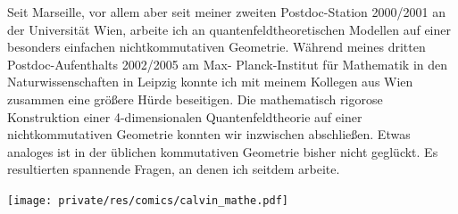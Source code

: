 \begin{multicols}{2}
Seit Marseille, vor allem aber seit meiner zweiten Postdoc-Station 2000/2001 an der Universität Wien, arbeite ich an quantenfeldtheoretischen Modellen auf einer besonders einfachen nichtkommutativen Geometrie. Während meines dritten Postdoc-Aufenthalts 2002/2005 am Max- Planck-Institut für Mathematik in den Naturwissenschaften in Leipzig konnte ich mit meinem Kollegen aus Wien zusammen eine größere Hürde beseitigen. Die mathematisch rigorose Konstruktion einer 4-dimensionalen Quantenfeldtheorie auf einer nichtkommutativen Geometrie konnten wir inzwischen abschließen. Etwas analoges ist in der üblichen kommutativen Geometrie bisher nicht geglückt. Es resultierten spannende Fragen, an denen ich seitdem arbeite.

\begin{center}
 	\texttt{[image: private/res/comics/calvin\_mathe.pdf]}
\end{center}

\end{multicols}
